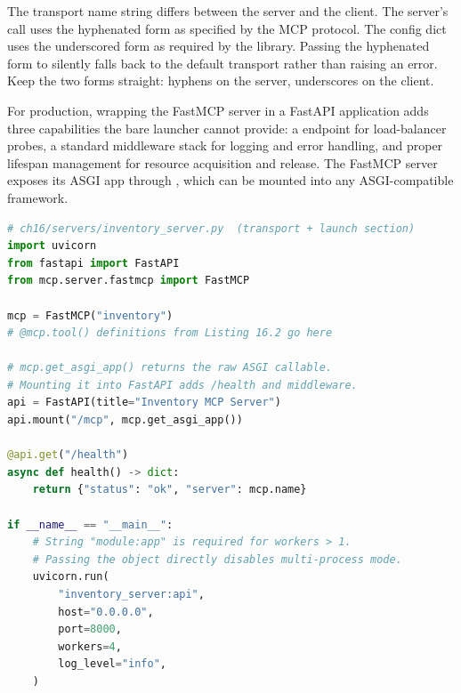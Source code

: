 \begin{notebox}
The transport name string differs between the server and the client.
The server's  call uses the hyphenated form
 as specified by the MCP protocol.
The  config dict uses the underscored form
 as required by the 
library. Passing the hyphenated form to 
silently falls back to the default transport rather than raising an error.
Keep the two forms straight: hyphens on the server, underscores on the
client.
\end{notebox}

For production, wrapping the FastMCP server in a FastAPI application
adds three capabilities the bare  launcher cannot
provide: a  endpoint for load-balancer probes, a standard
middleware stack for logging and error handling, and proper lifespan
management for resource acquisition and release.
The FastMCP server exposes its ASGI app through
, which can be mounted into any
ASGI-compatible framework.

\begin{lstlisting}[language=Python,
                   caption={FastMCP server mounted into FastAPI, served by uvicorn},
                   label={lst:mcp-production-server}]
# ch16/servers/inventory_server.py  (transport + launch section)
import uvicorn
from fastapi import FastAPI
from mcp.server.fastmcp import FastMCP

mcp = FastMCP("inventory")
# @mcp.tool() definitions from Listing 16.2 go here

# mcp.get_asgi_app() returns the raw ASGI callable.
# Mounting it into FastAPI adds /health and middleware.
api = FastAPI(title="Inventory MCP Server")
api.mount("/mcp", mcp.get_asgi_app())

@api.get("/health")
async def health() -> dict:
    return {"status": "ok", "server": mcp.name}

if __name__ == "__main__":
    # String "module:app" is required for workers > 1.
    # Passing the object directly disables multi-process mode.
    uvicorn.run(
        "inventory_server:api",
        host="0.0.0.0",
        port=8000,
        workers=4,
        log_level="info",
    )
\end{lstlisting}

